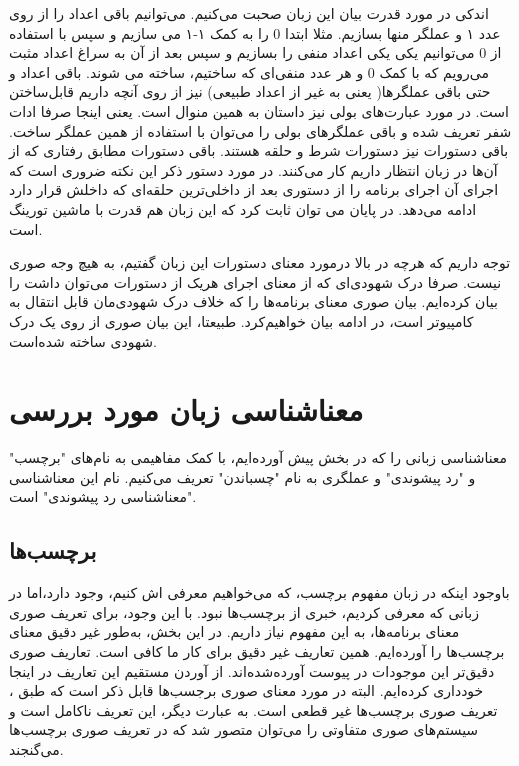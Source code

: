 اندکی در مورد قدرت بیان این زبان صحبت می‌کنیم. می‌توانیم باقی اعداد را از روی عدد ۱ و عملگر منها بسازیم. مثلا ابتدا 0 را به کمک ۱-۱ می سازیم و سپس با استفاده از 0 می‌توانیم یکی یکی اعداد منفی را بسازیم و سپس بعد از آن به سراغ اعداد مثبت می‌رویم که با کمک 0 و هر عدد منفی‌ای که ساختیم، ساخته می شوند. باقی اعداد و حتی باقی عملگر‌ها( یعنی به غیر از اعداد طبیعی) نیز از روی آنچه داریم قابل‌ساختن است. در مورد عبارت‌های بولی نیز داستان به همین منوال است. یعنی اینجا صرفا ادات شفر تعریف شده و باقی عملگر‌های بولی را می‌توان با استفاده از همین عملگر ساخت. باقی دستورات نیز دستورات شرط و حلقه هستند. باقی دستورات مطابق رفتاری که از آن‌ها در زبان  انتظار داریم کار می‌کنند. در مورد دستور  ذکر این نکته ضروری است که اجرای آن اجرای برنامه را از دستوری بعد از داخلی‌ترین حلقه‌ای که  داخلش قرار دارد ادامه می‌‌دهد. در پایان می توان ثابت کرد که این زبان هم قدرت با ماشین تورینگ\cite{davis} است. 

توجه داریم که هر‌چه در بالا در‌مورد معنای دستورات این زبان گفتیم، به هیچ وجه صوری نیست. صرفا درک شهودی‌ای که از معنای اجرای هر‌یک از دستورات می‌توان داشت را بیان کرده‌ایم. بیان صوری معنای برنامه‌ها را که خلاف درک شهودی‌مان قابل انتقال به کامپیوتر‌ است، در ادامه بیان خواهیم‌کرد. طبیعتا، این بیان صوری از روی یک درک شهودی ساخته شده‌است.

\section{معناشناسی زبان مورد بررسی‬}
معناشناسی زبانی را که در بخش پیش آورده‌ایم، با کمک مفاهیمی به نام‌های "برچسب" و "رد پیشوندی" و عملگری به نام "چسباندن" تعریف می‌کنیم. نام این معناشناسی "معناشناسی رد پیشوندی" است.\\

\subsection{برچسب‌ها}

با‌وجود اینکه در زبان  مفهوم برچسب، که می‌خواهیم معرفی اش کنیم، وجود دارد،اما در زبانی که معرفی کردیم، خبری از برچسب‌ها نبود. با این وجود، برای تعریف صوری معنای برنامه‌ها، به این مفهوم نیاز داریم. در این بخش، به‌طور غیر دقیق معنای برچسب‌ها را آورده‌ایم. همین تعاریف غیر دقیق برای کار ما کافی است. تعاریف صوری دقیق‌تر این موجودات در پیوست \cite{calcul} آورده‌شده‌اند. از آوردن مستقیم این تعاریف در اینجا خود‌داری کرده‌ایم. البته در مورد معنای صوری برجسب‌ها قابل ذکر است که طبق \cite{cousotbook}، تعریف صوری برچسب‌ها غیر قطعی است. به عبارت دیگر، این تعریف ناکامل است و سیستم‌های صوری متفاوتی را می‌توان متصور شد که در تعریف صوری برچسب‌ها می‌گنجند.

